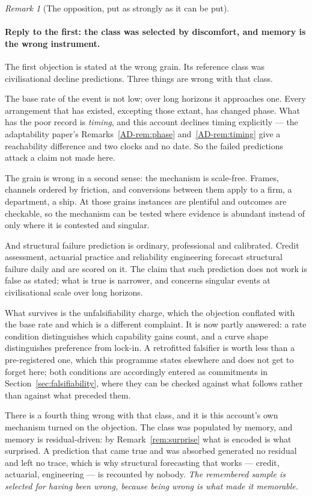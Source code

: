 \documentclass[11pt,a4paper]{article}
\theoremstyle{remark}
\newtheorem{remark}[definition]{Remark}
\begin{document}
\begin{remark}[The opposition, put as strongly as it can be put]
\paragraph{Reply to the first: the class was selected by discomfort, and memory is the wrong instrument.}
The first objection is stated at the wrong grain. Its reference class was civilisational decline
predictions. Three things are wrong with that class.

The base rate of the event is not low; over long horizons it approaches one. Every arrangement
that has existed, excepting those extant, has changed phase. What has the poor record is \emph{timing},
and this account declines timing explicitly --- the adaptability paper's Remarks~\ref{AD-rem:phase} and~\ref{AD-rem:timing} give a
reachability difference and two clocks and no date. So the failed predictions attack a claim not
made here.

The grain is wrong in a second sense: the mechanism is scale-free. Frames, channels ordered by
friction, and conversions between them apply to a firm, a department, a ship. At those grains
instances are plentiful and outcomes are checkable, so the mechanism can be tested where evidence is
abundant instead of only where it is contested and singular.

And structural failure prediction is ordinary, professional and calibrated. Credit assessment,
actuarial practice and reliability engineering forecast structural failure daily and are scored on it.
The claim that such prediction does not work is false as stated; what is true is narrower, and
concerns singular events at civilisational scale over long horizons.

What survives is the unfalsifiability charge, which the objection conflated with the base rate and
which is a different complaint. It is now partly answered: a rate condition distinguishes which
capability gains count, and a curve shape distinguishes preference from lock-in. A retrofitted
falsifier is worth less than a pre-registered one, which this programme states elsewhere and does not
get to forget here; both conditions are accordingly entered as commitments in
Section~\ref{sec:falsifiability}, where they can be checked against what follows rather than against
what preceded them.

There is a fourth thing wrong with that class, and it is this account's own mechanism turned on
the objection. The class was populated by memory, and memory is residual-driven: by
Remark~\ref{rem:surprise} what is encoded is what surprised. A prediction that came true and was
absorbed generated no residual and left no trace, which is why structural forecasting that works ---
credit, actuarial, engineering --- is recounted by nobody. \emph{The remembered sample is selected for
having been wrong, because being wrong is what made it memorable.}


\end{remark}
\end{document}
